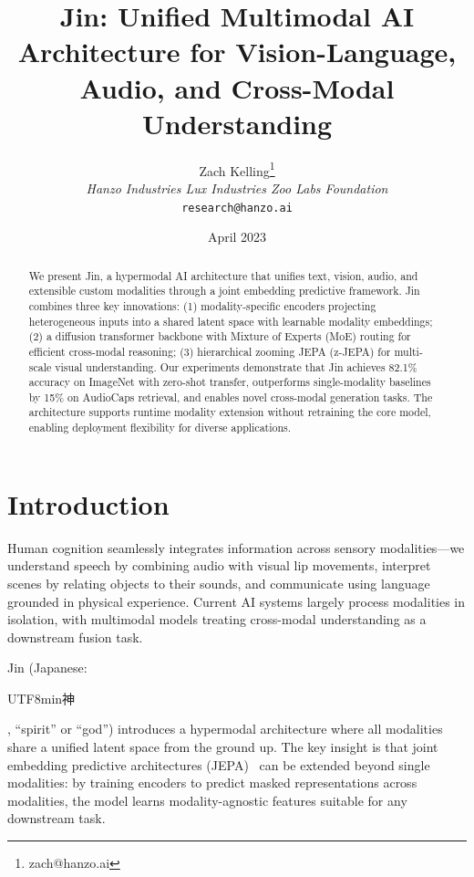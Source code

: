 \documentclass[11pt,twocolumn]{article}
\title{Jin: Unified Multimodal AI Architecture for Vision-Language, Audio, and Cross-Modal Understanding}
\author{Zach Kelling\thanks{zach@hanzo.ai} \\ \textit{Hanzo Industries \quad Lux Industries \quad Zoo Labs Foundation} \\ \texttt{research@hanzo.ai}}
\date{April 2023}
\begin{document}
\luxcoverpage

\begin{abstract}
We present Jin, a hypermodal AI architecture that unifies text, vision, audio, and extensible custom modalities through a joint embedding predictive framework. Jin combines three key innovations: (1) modality-specific encoders projecting heterogeneous inputs into a shared latent space with learnable modality embeddings; (2) a diffusion transformer backbone with Mixture of Experts (MoE) routing for efficient cross-modal reasoning; (3) hierarchical zooming JEPA (z-JEPA) for multi-scale visual understanding. Our experiments demonstrate that Jin achieves 82.1\% accuracy on ImageNet with zero-shot transfer, outperforms single-modality baselines by 15\% on AudioCaps retrieval, and enables novel cross-modal generation tasks. The architecture supports runtime modality extension without retraining the core model, enabling deployment flexibility for diverse applications.
\end{abstract}

\section{Introduction}

Human cognition seamlessly integrates information across sensory modalities---we understand speech by combining audio with visual lip movements, interpret scenes by relating objects to their sounds, and communicate using language grounded in physical experience. Current AI systems largely process modalities in isolation, with multimodal models treating cross-modal understanding as a downstream fusion task.

Jin (Japanese: \begin{CJK}{UTF8}{min}神\end{CJK}, ``spirit'' or ``god'') introduces a hypermodal architecture where all modalities share a unified latent space from the ground up. The key insight is that joint embedding predictive architectures (JEPA)~\cite{jepa2022} can be extended beyond single modalities: by training encoders to predict masked representations across modalities, the model learns modality-agnostic features suitable for any downstream task.
\end{document}
